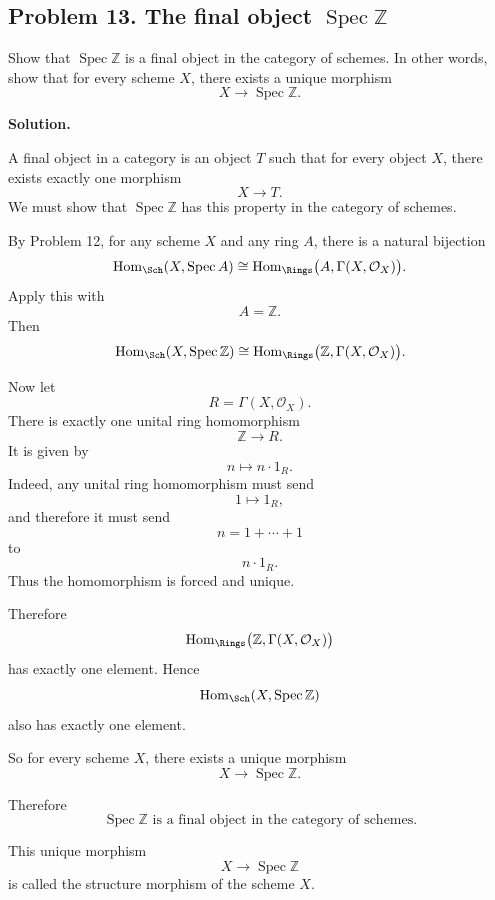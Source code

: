 
\subsection*{Problem 13. The final object \(\operatorname{Spec} \mathbb Z\)}

Show that \(\operatorname{Spec} \mathbb Z\) is a final object in the category of schemes. In other words, show that for every scheme \(X\), there exists a unique morphism
\[
X\to \operatorname{Spec} \mathbb Z.
\]

\textbf{Solution.}

A final object in a category is an object \(T\) such that for every object \(X\), there exists exactly one morphism
\[
X\to T.
\]
We must show that \(\operatorname{Spec} \mathbb Z\) has this property in the category of schemes.

By Problem 12, for any scheme \(X\) and any ring \(A\), there is a natural bijection
\[
\operatorname{Hom}_{\Sch}(X,\operatorname{Spec} A)
\cong
\operatorname{Hom}_{\Rings}\bigl(A,\Gamma(X,\mathcal O_X)\bigr).
\]
Apply this with
\[
A=\mathbb Z.
\]
Then
\[
\operatorname{Hom}_{\Sch}(X,\operatorname{Spec} \mathbb Z)
\cong
\operatorname{Hom}_{\Rings}\bigl(\mathbb Z,\Gamma(X,\mathcal O_X)\bigr).
\]

Now let
\[
R=\Gamma(X,\mathcal O_X).
\]
There is exactly one unital ring homomorphism
\[
\mathbb Z\to R.
\]
It is given by
\[
n\longmapsto n\cdot 1_R.
\]
Indeed, any unital ring homomorphism must send
\[
1\longmapsto 1_R,
\]
and therefore it must send
\[
n=1+\cdots+1
\]
to
\[
n\cdot 1_R.
\]
Thus the homomorphism is forced and unique.

Therefore
\[
\operatorname{Hom}_{\Rings}\bigl(\mathbb Z,\Gamma(X,\mathcal O_X)\bigr)
\]
has exactly one element. Hence
\[
\operatorname{Hom}_{\Sch}(X,\operatorname{Spec} \mathbb Z)
\]
also has exactly one element.

So for every scheme \(X\), there exists a unique morphism
\[
X\to \operatorname{Spec} \mathbb Z.
\]

Therefore
\[
\boxed{
	\operatorname{Spec} \mathbb Z \text{ is a final object in the category of schemes.}
}
\]

This unique morphism
\[
X\to \operatorname{Spec} \mathbb Z
\]
is called the structure morphism of the scheme \(X\).
